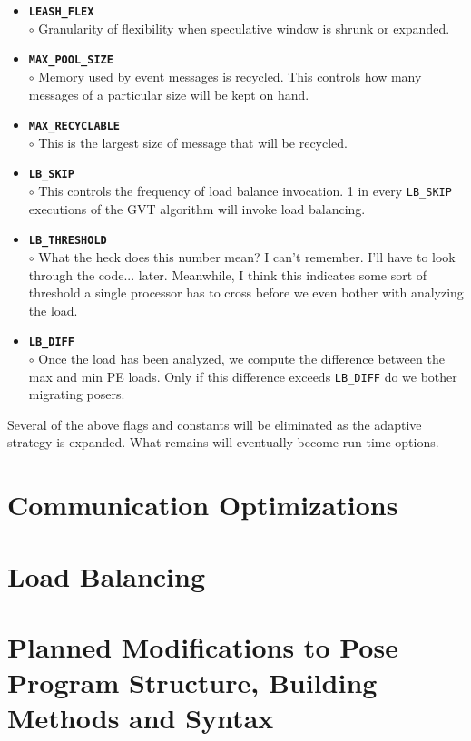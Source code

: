 \documentclass[10pt]{article}
\newcommand{\pose}{{\sc Pose}}
\begin{document}
\begin{itemize}
\item {\tt {\bf LEASH\_FLEX}}\\
	$\circ$ Granularity of flexibility when speculative window is shrunk or expanded.\\
\item {\tt {\bf MAX\_POOL\_SIZE}}\\
	$\circ$ Memory used by event messages is recycled.  This controls how many messages of a particular size will be kept on hand.
\item {\tt {\bf MAX\_RECYCLABLE}}\\
	$\circ$ This is the largest size of message that will be recycled.
\item {\tt {\bf LB\_SKIP}}\\
	$\circ$ This controls the frequency of load balance invocation.  1 in every {\tt LB\_SKIP} executions of the GVT algorithm will invoke load balancing.
\item {\tt {\bf LB\_THRESHOLD}}\\
	$\circ$ What the heck does this number mean?  I can't remember.  I'll have to look through the code... later.  Meanwhile, I think this indicates some sort of threshold a single processor has to cross before we even bother with analyzing the load.\\
\item {\tt {\bf LB\_DIFF}}\\
	$\circ$ Once the load has been analyzed, we compute the difference between the max and min PE loads.  Only if this difference exceeds {\tt LB\_DIFF} do we bother migrating posers.\\
\end{itemize}

Several of the above flags and constants will be eliminated as the adaptive strategy is expanded.  What remains will eventually become run-time options.

\section{Communication Optimizations}

\section{Load Balancing}

\section{Planned Modifications to \pose{} Program Structure, Building Methods and Syntax}
\end{document}
